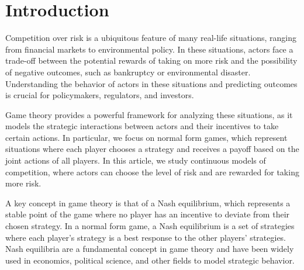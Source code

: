 \documentclass[preprint,12pt,authoryear]{elsarticle}
\theoremstyle{definition}
\begin{document}
\begin{frontmatter}
\begin{abstract}
\end{abstract}




\end{frontmatter}

\section{Introduction}
\label{sec:introduction}

Competition over risk is a ubiquitous feature of many real-life situations, ranging from financial markets to environmental policy. In these situations, actors face a trade-off between the potential rewards of taking on more risk and the possibility of negative outcomes, such as bankruptcy or environmental disaster. Understanding the behavior of actors in these situations and predicting outcomes is crucial for policymakers, regulators, and investors.

Game theory provides a powerful framework for analyzing these situations, as it models the strategic interactions between actors and their incentives to take certain actions. In particular, we focus on normal form games, which represent situations where each player chooses a strategy and receives a payoff based on the joint actions of all players. In this article, we study continuous models of competition, where actors can choose the level of risk and are rewarded for taking more risk.

A key concept in game theory is that of a Nash equilibrium, which represents a stable point of the game where no player has an incentive to deviate from their chosen strategy. In a normal form game, a Nash equilibrium is a set of strategies where each player's strategy is a best response to the other players' strategies. Nash equilibria are a fundamental concept in game theory and have been widely used in economics, political science, and other fields to model strategic behavior.
\end{document}
